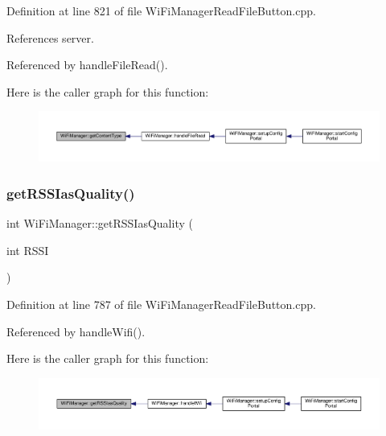Definition at line 821 of file Wi\+Fi\+Manager\+Read\+File\+Button.\+cpp.



References server.



Referenced by handle\+File\+Read().

Here is the caller graph for this function\+:
\nopagebreak
\begin{figure}[H]
\begin{center}
\leavevmode
\includegraphics[width=350pt]{d4/dc8/class_wi_fi_manager_a40f123fd290c3e331c9785d19a88f3b8_icgraph}
\end{center}
\end{figure}
\mbox{\label{class_wi_fi_manager_ae71cfd6bd70ada2ca02e1d20b152d0e5}} 
\subsubsection{\texorpdfstring{get\+R\+S\+S\+Ias\+Quality()}{getRSSIasQuality()}}
{\footnotesize\ttfamily int Wi\+Fi\+Manager\+::get\+R\+S\+S\+Ias\+Quality (\begin{DoxyParamCaption}\item[{int}]{R\+S\+SI }\end{DoxyParamCaption})\hspace{0.3cm}{\ttfamily [private]}}



Definition at line 787 of file Wi\+Fi\+Manager\+Read\+File\+Button.\+cpp.



Referenced by handle\+Wifi().

Here is the caller graph for this function\+:
\nopagebreak
\begin{figure}[H]
\begin{center}
\leavevmode
\includegraphics[width=350pt]{d4/dc8/class_wi_fi_manager_ae71cfd6bd70ada2ca02e1d20b152d0e5_icgraph}
\end{center}
\end{figure}
\mbox{\label{class_wi_fi_manager_a9c78a8774f746ec22a99d03a53baa607}} 
